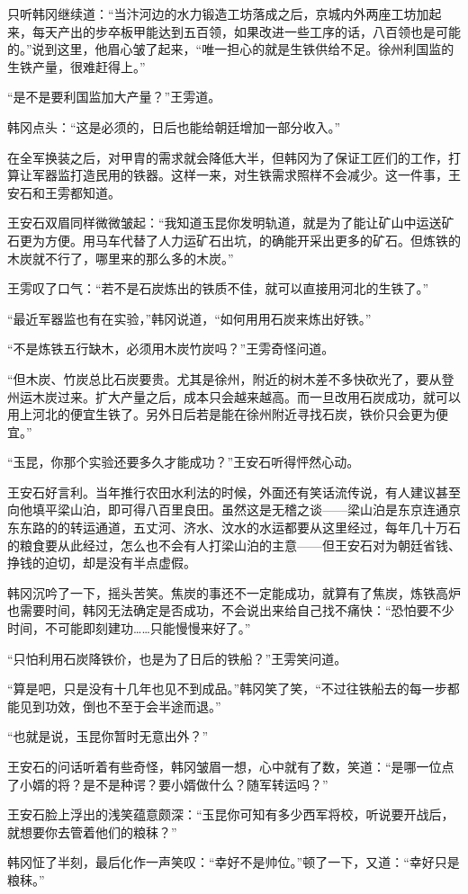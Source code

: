 只听韩冈继续道：“当汴河边的水力锻造工坊落成之后，京城内外两座工坊加起来，每天产出的步卒板甲能达到五百领，如果改进一些工序的话，八百领也是可能的。”说到这里，他眉心皱了起来，“唯一担心的就是生铁供给不足。徐州利国监的生铁产量，很难赶得上。”

“是不是要利国监加大产量？”王雱道。

韩冈点头：“这是必须的，日后也能给朝廷增加一部分收入。”

在全军换装之后，对甲胄的需求就会降低大半，但韩冈为了保证工匠们的工作，打算让军器监打造民用的铁器。这样一来，对生铁需求照样不会减少。这一件事，王安石和王雱都知道。

王安石双眉同样微微皱起：“我知道玉昆你发明轨道，就是为了能让矿山中运送矿石更为方便。用马车代替了人力运矿石出坑，的确能开采出更多的矿石。但炼铁的木炭就不行了，哪里来的那么多的木炭。”

王雱叹了口气：“若不是石炭炼出的铁质不佳，就可以直接用河北的生铁了。”

“最近军器监也有在实验，”韩冈说道，“如何用用石炭来炼出好铁。”

“不是炼铁五行缺木，必须用木炭竹炭吗？”王雱奇怪问道。

“但木炭、竹炭总比石炭要贵。尤其是徐州，附近的树木差不多快砍光了，要从登州运木炭过来。扩大产量之后，成本只会越来越高。而一旦改用石炭成功，就可以用上河北的便宜生铁了。另外日后若是能在徐州附近寻找石炭，铁价只会更为便宜。”

“玉昆，你那个实验还要多久才能成功？”王安石听得怦然心动。

王安石好言利。当年推行农田水利法的时候，外面还有笑话流传说，有人建议甚至向他填平梁山泊，即可得八百里良田。虽然这是无稽之谈——梁山泊是东京连通京东东路的的转运通道，五丈河、济水、汶水的水运都要从这里经过，每年几十万石的粮食要从此经过，怎么也不会有人打梁山泊的主意——但王安石对为朝廷省钱、挣钱的迫切，却是没有半点虚假。

韩冈沉吟了一下，摇头苦笑。焦炭的事还不一定能成功，就算有了焦炭，炼铁高炉也需要时间，韩冈无法确定是否成功，不会说出来给自己找不痛快：“恐怕要不少时间，不可能即刻建功……只能慢慢来好了。”

“只怕利用石炭降铁价，也是为了日后的铁船？”王雱笑问道。

“算是吧，只是没有十几年也见不到成品。”韩冈笑了笑，“不过往铁船去的每一步都能见到功效，倒也不至于会半途而退。”

“也就是说，玉昆你暂时无意出外？”

王安石的问话听着有些奇怪，韩冈皱眉一想，心中就有了数，笑道：“是哪一位点了小婿的将？是不是种谔？要小婿做什么？随军转运吗？”

王安石脸上浮出的浅笑蕴意颇深：“玉昆你可知有多少西军将校，听说要开战后，就想要你去管着他们的粮秣？”

韩冈怔了半刻，最后化作一声笑叹：“幸好不是帅位。”顿了一下，又道：“幸好只是粮秣。”

